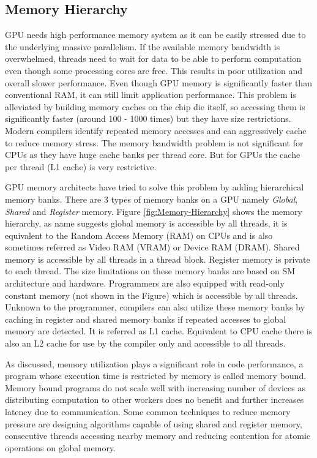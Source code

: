 \subsection{Memory Hierarchy}
GPU needs high performance memory system as it can be easily stressed due to the underlying massive parallelism.
If the available memory bandwidth is overwhelmed, threads need to wait for data to be able to perform computation even though some processing cores are free. This results in poor utilization and overall slower performance.
Even though GPU memory is significantly faster than conventional RAM, it can still limit application performance.
This problem is alleviated by building memory caches on the chip die itself, so accessing them is significantly faster (around 100 - 1000 times) but they have size restrictions.
Modern compilers identify repeated memory accesses and can aggressively cache to reduce memory stress.
The memory bandwidth problem is not significant for CPUs as they have huge cache banks per thread core. But for GPUs the cache per thread (L1 cache) is very restrictive.

GPU memory architects have tried to solve this problem by adding hierarchical memory banks. There are 3 types of memory banks on a GPU namely \textit{Global}, \textit{Shared} and \textit{Register} memory.
Figure \ref{fig:Memory-Hierarchy} shows the memory hierarchy, as name suggests global memory is accessible by all threads, it is equivalent to the Random Access Memory (RAM) on CPUs and is also sometimes referred as Video RAM (VRAM) or Device RAM (DRAM).
Shared memory is accessible by all threads in a thread block.
Register memory is private to each thread.
The size limitations on these memory banks are based on SM architecture and hardware.
Programmers are also equipped with read-only constant memory (not shown in the Figure) which is accessible by all threads.
Unknown to the programmer, compilers can also utilize these memory banks by caching in register and shared memory banks if repeated accesses to global memory are detected. It is referred as L1 cache. Equivalent to CPU cache there is also an L2 cache for use by the compiler only and accessible to all threads.

As discussed, memory utilization plays a significant role in code performance, a program whose execution time is restricted by memory is called memory bound. Memory bound programs do not scale well with increasing number of devices as distributing computation to other workers does no benefit and further increases latency due to communication.
Some common techniques to reduce memory pressure are designing algorithms capable of using shared and register memory, consecutive threads accessing nearby memory and reducing contention for atomic operations on global memory.



